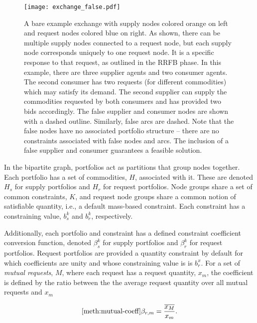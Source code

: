 \begin{figure}
  \begin{center}
    \texttt{[image: exchange\_false.pdf]}
    \caption{A bare example exchange with supply nodes colored orange on left
      and request nodes colored blue on right. As shown, there can be multiple
      supply nodes connected to a request node, but each supply node corresponds
      uniquely to one request node. It is a specific response to that request,
      as outlined in the RRFB phase. In this example, there are three
      supplier agents and two consumer agents. The second consumer has two
      requests (for different commodities) which may satisfy its demand. The
      second supplier can supply the commodities requested by both consumers and
      has provided two bids accordingly. The false supplier and consumer nodes are
      shown with a dashed outline. Similarly, false arcs are dashed. Note that
      the false nodes have no associated portfolio structure -- there are no
      constraints associated with false nodes and arcs. The inclusion of a false
      supplier and consumer guarantees a feasible solution.}
    \label{fig:ex_false}
  \end{center}
\end{figure}

In the bipartite graph, portfolios act as partitions that group nodes together.
Each portfolio has a set of commodities, $H$, associated with it. These are
denoted $H_s$ for supply portfolios and $H_r$ for request portfolios. Node
groups share a set of common constraints, $K$, and request node groups share a
common notion of satisfiable quantity, i.e., a default mass-based
constraint. Each constraint has a constraining value, $b_s^k$ and $b_r^k$,
respectively.

Additionally, each portfolio and constraint has a defined constraint coefficient
conversion function, denoted $\beta_s^k$ for supply portfolios and $\beta_r^k$
for request portfolios. Request portfolios are provided a quantity constraint by
default for which coefficients are unity and whose constraining value is is
$b^{x}_{r}$. For a set of \textit{mutual requests}, $M$, where each request has
a request quantity, $x_m$, the coefficient is defined by the ratio between the
the average request quantity over all mutual requests and $x_m$

\begin{equation}\ref{meth:mutual-coeff}
  \beta_{r, m} = \frac{\overline{x_M}}{x_m}.
\end{equation}

